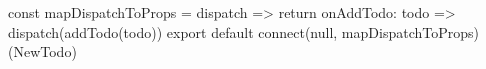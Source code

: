 const mapDispatchToProps = dispatch => {
  return {
    onAddTodo: todo => dispatch(addTodo(todo))
  }
}
export default connect(null, mapDispatchToProps)(NewTodo)